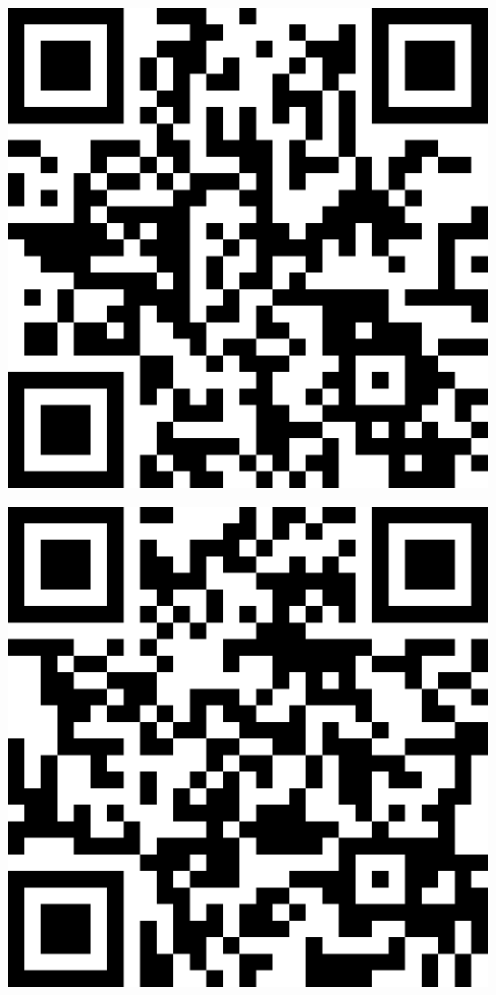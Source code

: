 \documentclass[letterpaper]{article}
\begin{document}
 \endgroup 
 \vspace*{\fill} 
 \pagebreak 
{} 
 \vspace*{\fill} 
 \begingroup 
 \centerline{\includegraphics[scale=1,width=5in,height=5in]{GraphicsLab.png}} 
 \endgroup 
 \vspace*{\fill} 
 \pagebreak 
{} 
 \vspace*{\fill} 
 \begingroup 
 \centerline{\includegraphics[scale=1,width=5in,height=5in]{HonorsLab.png}} 
\end{document}
